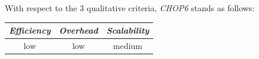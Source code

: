 %
With respect to the $3$ qualitative criteria, \emph{CHOP6} stands as follows:
\begin{center}
{\footnotesize
\begin{tabular}{ccc}
\emph{Efficiency} & \emph{Overhead} & \emph{Scalability} \\
\hline
low &
low &
medium
\end{tabular}
}
\end{center}



